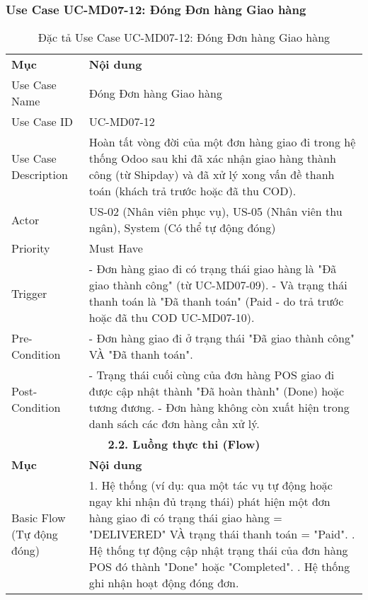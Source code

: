 \subsubsection{Use Case UC-MD07-12: Đóng Đơn hàng Giao hàng}

\begin{longtable}{|m{4cm}|p{11cm}|}
\caption{Đặc tả Use Case UC-MD07-12: Đóng Đơn hàng Giao hàng} \label{tab:uc_md07_12} \\
\hline

\endhead %
\hline
\endfoot %
\hline
\endlastfoot %
\multicolumn{2}{|c|}{\textbf{2.1. Tóm tắt (Summary)}} \\
\hline
\textbf{Mục} & \textbf{Nội dung} \\
\hline
Use Case Name & Đóng Đơn hàng Giao hàng \\
\hline
Use Case ID & UC-MD07-12 \\
\hline
Use Case Description & Hoàn tất vòng đời của một đơn hàng giao đi trong hệ thống Odoo sau khi đã xác nhận giao hàng thành công (từ Shipday) và đã xử lý xong vấn đề thanh toán (khách trả trước hoặc đã thu COD). \\
\hline
Actor & US-02 (Nhân viên phục vụ), US-05 (Nhân viên thu ngân), System (Có thể tự động đóng) \\
\hline
Priority & Must Have \\
\hline
Trigger & - Đơn hàng giao đi có trạng thái giao hàng là "Đã giao thành công" (từ UC-MD07-09). \newline - Và trạng thái thanh toán là "Đã thanh toán" (Paid - do trả trước hoặc đã thu COD UC-MD07-10). \\
\hline
Pre-Condition & - Đơn hàng giao đi ở trạng thái "Đã giao thành công" VÀ "Đã thanh toán". \\
\hline
Post-Condition & - Trạng thái cuối cùng của đơn hàng POS giao đi được cập nhật thành "Đã hoàn thành" (Done) hoặc tương đương. \newline - Đơn hàng không còn xuất hiện trong danh sách các đơn hàng cần xử lý. \\
\hline
\multicolumn{2}{|c|}{\textbf{2.2. Luồng thực thi (Flow)}} \\
\hline
\textbf{Mục} & \textbf{Nội dung} \\
\hline
Basic Flow (Tự động đóng) & 1. Hệ thống (ví dụ: qua một tác vụ tự động hoặc ngay khi nhận đủ trạng thái) phát hiện một đơn hàng giao đi có trạng thái giao hàng = "DELIVERED" VÀ trạng thái thanh toán = "Paid". \newline 2. Hệ thống tự động cập nhật trạng thái của đơn hàng POS đó thành "Done" hoặc "Completed". \newline 3. Hệ thống ghi nhận hoạt động đóng đơn. \\

\end{longtable}
